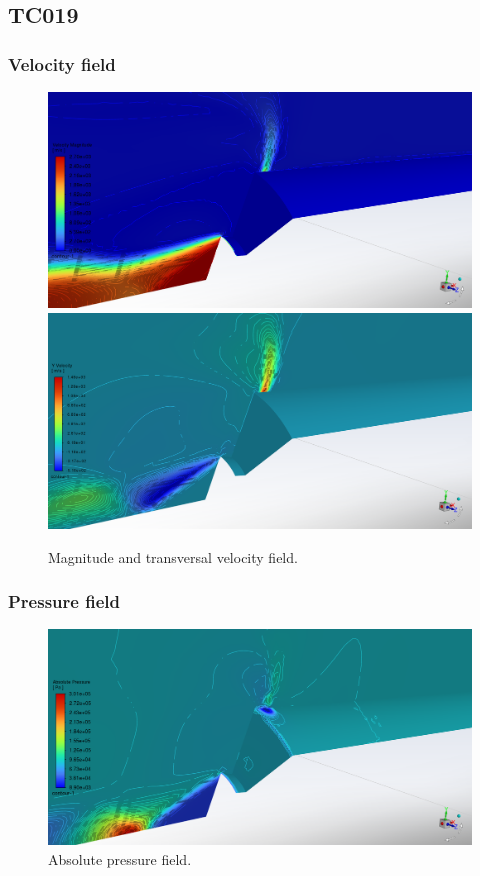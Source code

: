 \documentclass[12pt]{article}
\begin{document}
\subsection{TC019}\label{sec:TC019}

\subsubsection*{Velocity field}

\begin{figure}[H]
    \centering
    \includegraphics[width=0.495\linewidth]{figs/t19s/magV.png}
    \includegraphics[width=0.495\linewidth]{figs/t19s/v.PNG}
    \caption{Magnitude and transversal velocity field.}
    \label{fig:enter-label}
\end{figure}

\subsubsection*{Pressure field}

\begin{figure}[H]
    \centering
    \includegraphics[width=\linewidth]{figs/t19s/pabs.png}
    \caption{Absolute pressure field.}
    \label{fig:enter-label}
\end{figure}
\end{document}
